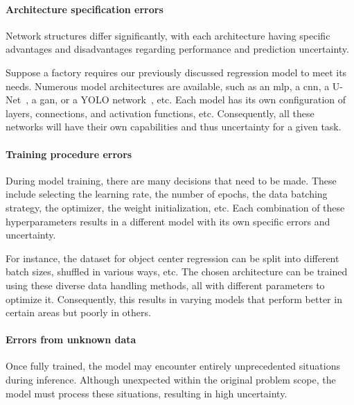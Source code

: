 \paragraph{Architecture specification errors} \label{ch:literature-study_section:uncertainty-in-ai_subsection:epistemic-uncertainty_paragraph:architecture-specification-errors}
Network structures differ significantly, with each architecture having specific advantages and disadvantages regarding performance and prediction uncertainty.

Suppose a factory requires our previously discussed regression model to meet its needs.
Numerous model architectures are available, such as an \gls{mlp}, a \gls{cnn}, a U-Net~\cite{src:u-net}, a \gls{gan}, or a YOLO network~\cite{src:yolo}, etc.
Each model has its own configuration of layers, connections, and activation functions, etc.
Consequently, all these networks will have their own capabilities and thus uncertainty for a given task.

\paragraph{Training procedure errors} \label{ch:literature-study_section:uncertainty-in-ai_subsection:epistemic-uncertainty_paragraph:training-procedure-errors}
During model training, there are many decisions that need to be made.
These include selecting the learning rate, the number of epochs, the data batching strategy, the optimizer, the weight initialization, etc.
Each combination of these hyperparameters results in a different model with its own specific errors and uncertainty.

For instance, the dataset for object center regression can be split into different batch sizes, shuffled in various ways, etc.
The chosen architecture can be trained using these diverse data handling methods, all with different parameters to optimize it.
Consequently, this results in varying models that perform better in certain areas but poorly in others.

\paragraph{Errors from unknown data} \label{ch:literature-study_section:uncertainty-in-ai_subsection:epistemic-uncertainty_paragraph:errors-from-unknown-data}
Once fully trained, the model may encounter entirely unprecedented situations during inference.
Although unexpected within the original problem scope, the model must process these situations, resulting in high uncertainty.

